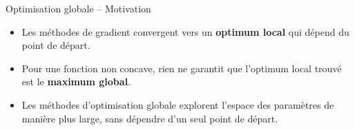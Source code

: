\documentclass[11pt,aspectratio=169]{beamer}
\begin{document}
\begin{frame}{Optimisation globale -- Motivation}

\begin{itemize}

\item Les méthodes de gradient convergent vers un \textbf{optimum local} qui dépend du point de départ.

\item Pour une fonction non concave, rien ne garantit que l'optimum local trouvé est le \textbf{maximum global}.

\item Les méthodes d'optimisation globale explorent l'espace des paramètres de manière plus large, sans dépendre d'un seul point de départ.

\end{itemize}

\begin{center}
\end{center}

\end{frame}
\end{document}
